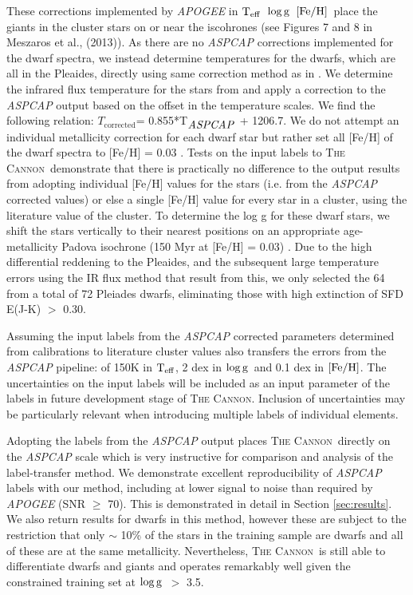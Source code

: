 \documentclass[12pt, preprint]{aastex}
\newcommand{\teff}{\mbox{$\rm T_{eff}$}}
\newcommand{\feh}{\mbox{$\rm [Fe/H]$}}
\newcommand{\logg}{\mbox{$\rm \log g$}}
\newcommand{\tc}{\textsc{The Cannon}}
\begin{document}
These corrections implemented by \textit{APOGEE} in \teff\, \logg\, \feh\ place the giants in the cluster stars on or near the iscohrones (see Figures 7 and 8 in Meszaros et al., (2013)).  As there are no \textit{ASPCAP} corrections implemented for the dwarf spectra, we instead determine temperatures for the dwarfs, which are all in the Pleaides, directly using same correction method as in \citet{Meszaros2013}. We determine the infrared flux temperature for the stars from \citep{Gonzalez2009} and apply a correction to the \textit{ASPCAP} output based on the offset in the temperature scales. We find the following relation: $T_{\mbox{corrected}}$= 0.855*T$_{\mbox{\textit{ASPCAP}}}$ + 1206.7. We do not attempt an individual metallicity correction for each dwarf star but rather set all [Fe/H] of the dwarf spectra to [Fe/H] = 0.03 \citep{Barrado2001}. Tests on the input labels to \tc\ demonstrate that there is practically no difference to the output results from adopting individual [Fe/H] values for the stars (i.e. from the \textit{ASPCAP} corrected values) or else a single [Fe/H] value for every star in a cluster, using the literature value of the cluster. To determine the log g for these dwarf stars, we shift the stars vertically to their nearest positions on an appropriate age-metallicity Padova isochrone (150 Myr at [Fe/H] = 0.03) \citep{Girardi2010}. Due to the high differential reddening to the Pleaides, and the subsequent large temperature errors using the IR flux method that result from this, we only selected the 64 from a total of 72 Pleiades dwarfs, eliminating those with high extinction of SFD E(J-K) $>$ 0.30.

Assuming the input labels from the \textit{ASPCAP} corrected parameters determined from calibrations to literature cluster values also transfers the errors from the \textit{ASPCAP} pipeline: of 150K in \teff,  2 dex in \logg\ and 0.1 dex in \feh.   The uncertainties on the input labels will be included as an input parameter of the labels in future development stage of \tc. Inclusion of uncertainties may be particularly relevant when introducing multiple labels of individual elements. %

Adopting the labels from the \textit{ASPCAP} output places \tc\ directly on the \textit{ASPCAP} scale which is very instructive for comparison and analysis of the label-transfer method. We demonstrate excellent reproducibility of \textit{ASPCAP} labels with our method, including at lower signal to noise than required by \textit{APOGEE} (SNR $\ge$ 70). This is demonstrated in detail in Section \ref{sec:results}. We also return results for dwarfs in this method, however these are subject to the restriction that only $\sim$ 10\% of the stars in the training sample are dwarfs and all of these are at the same metallicity. Nevertheless, \tc\ is still able to differentiate dwarfs and giants and operates remarkably well given the constrained training set at \logg\ $>$ 3.5. 
\end{document}
